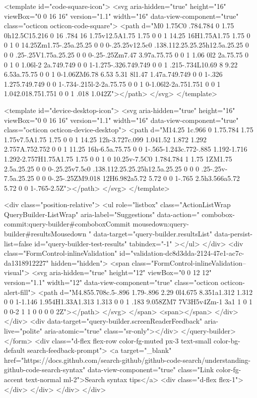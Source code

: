 <template id="code-square-icon">
  <svg aria-hidden="true" height="16" viewBox="0 0 16 16" version="1.1" width="16" data-view-component="true" class="octicon octicon-code-square">
    <path d="M0 1.75C0 .784.784 0 1.75 0h12.5C15.216 0 16 .784 16 1.75v12.5A1.75 1.75 0 0 1 14.25 16H1.75A1.75 1.75 0 0 1 0 14.25Zm1.75-.25a.25.25 0 0 0-.25.25v12.5c0 .138.112.25.25.25h12.5a.25.25 0 0 0 .25-.25V1.75a.25.25 0 0 0-.25-.25Zm7.47 3.97a.75.75 0 0 1 1.06 0l2 2a.75.75 0 0 1 0 1.06l-2 2a.749.749 0 0 1-1.275-.326.749.749 0 0 1 .215-.734L10.69 8 9.22 6.53a.75.75 0 0 1 0-1.06ZM6.78 6.53 5.31 8l1.47 1.47a.749.749 0 0 1-.326 1.275.749.749 0 0 1-.734-.215l-2-2a.75.75 0 0 1 0-1.06l2-2a.751.751 0 0 1 1.042.018.751.751 0 0 1 .018 1.042Z"></path>
</svg>
</template>

<template id="device-desktop-icon">
  <svg aria-hidden="true" height="16" viewBox="0 0 16 16" version="1.1" width="16" data-view-component="true" class="octicon octicon-device-desktop">
    <path d="M14.25 1c.966 0 1.75.784 1.75 1.75v7.5A1.75 1.75 0 0 1 14.25 12h-3.727c.099 1.041.52 1.872 1.292 2.757A.752.752 0 0 1 11.25 16h-6.5a.75.75 0 0 1-.565-1.243c.772-.885 1.192-1.716 1.292-2.757H1.75A1.75 1.75 0 0 1 0 10.25v-7.5C0 1.784.784 1 1.75 1ZM1.75 2.5a.25.25 0 0 0-.25.25v7.5c0 .138.112.25.25.25h12.5a.25.25 0 0 0 .25-.25v-7.5a.25.25 0 0 0-.25-.25ZM9.018 12H6.982a5.72 5.72 0 0 1-.765 2.5h3.566a5.72 5.72 0 0 1-.765-2.5Z"></path>
</svg>
</template>

        <div class="position-relative">
                <ul
                  role="listbox"
                  class="ActionListWrap QueryBuilder-ListWrap"
                  aria-label="Suggestions"
                  data-action="
                    combobox-commit:query-builder#comboboxCommit
                    mousedown:query-builder#resultsMousedown
                  "
                  data-target="query-builder.resultsList"
                  data-persist-list=false
                  id="query-builder-test-results"
                  tabindex="-1"
                ></ul>
        </div>
      <div class="FormControl-inlineValidation" id="validation-dc8d3dda-2124-47e1-ac7c-da1318912227" hidden="hidden">
        <span class="FormControl-inlineValidation--visual">
          <svg aria-hidden="true" height="12" viewBox="0 0 12 12" version="1.1" width="12" data-view-component="true" class="octicon octicon-alert-fill">
    <path d="M4.855.708c.5-.896 1.79-.896 2.29 0l4.675 8.351a1.312 1.312 0 0 1-1.146 1.954H1.33A1.313 1.313 0 0 1 .183 9.058ZM7 7V3H5v4Zm-1 3a1 1 0 1 0 0-2 1 1 0 0 0 0 2Z"></path>
</svg>
        </span>
        <span></span>
</div>    </div>
    <div data-target="query-builder.screenReaderFeedback" aria-live="polite" aria-atomic="true" class="sr-only"></div>
</query-builder></form>
          <div class="d-flex flex-row color-fg-muted px-3 text-small color-bg-default search-feedback-prompt">
            <a target="_blank" href="https://docs.github.com/search-github/github-code-search/understanding-github-code-search-syntax" data-view-component="true" class="Link color-fg-accent text-normal ml-2">Search syntax tips</a>            <div class="d-flex flex-1"></div>
          </div>
        </div>
</div>

